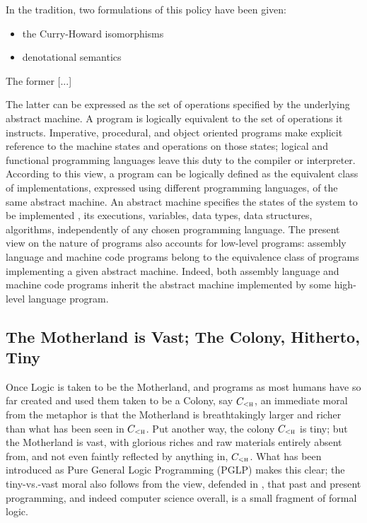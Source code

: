 \documentclass[]{article}
\begin{document}
In the tradition, two formulations of this policy have been given:

\begin{itemize}
\item the Curry-Howard isomorphisms
\item denotational semantics
\end{itemize}




{\color{red}{this passage is inspired by Jean-Baptiste's note}}


The former [...]

The latter can be expressed as the set of operations specified by the underlying abstract machine. A program is logically equivalent to the set of
operations it instructs. Imperative, procedural, and object oriented programs make explicit reference to the machine states and operations on those states; logical and functional programming languages leave this duty to the compiler or interpreter.  According to this view, a program can be logically defined as the equivalent class of implementations, expressed using different programming languages, of the same abstract machine. An abstract machine specifies the states of the system to be  implemented , its executions, variables, data types, data structures, algorithms, independently of any chosen programming language. The present view on the nature of programs also accounts for low-level programs: assembly language and machine code programs belong to the equivalence class of programs implementing a given abstract machine. Indeed, both assembly language and machine code programs inherit the abstract machine implemented by some high-level language program.


\subsection{The Motherland is Vast; The Colony, Hitherto, Tiny}
\label{sect:motherlandvast_colonytiny}

\noindent
%
Once Logic is taken to be the Motherland, and programs as most humans
have so far created and used them taken to be a Colony, say
$C_\textsc{<h}$, an immediate moral from the metaphor is that the
Motherland is breathtakingly larger and richer than what has been seen
in $C_\textsc{<h}$.  Put another way, the colony $C_\textsc{<h}$ is
tiny; but the Motherland is vast, with glorious riches and raw
materials entirely absent from, and not even faintly reflected by
anything in, $C_\textsc{<h}$.  What has been introduced as Pure
General Logic Programming (PGLP) \cite{introduction_of_PGLP} makes
this clear; the tiny-vs.-vast moral also follows from the view,
defended in \cite{comp_sci_immaterial_formal_logic}, that past and
present programming, and indeed computer science overall, is a small
fragment of formal logic.
\end{document}
